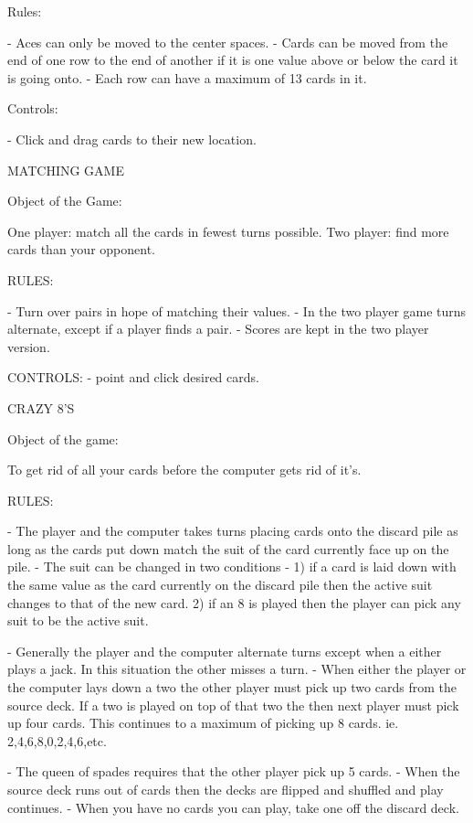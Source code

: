 Rules:

- Aces can only be moved to the center spaces.
- Cards can be moved from the end of one row to the end of another if 
  it is one value above or below the card it is going onto.
- Each row can have a maximum of 13 cards in it.

Controls:

- Click and drag cards to their new location.



MATCHING GAME

Object of the Game:

One player: match all the cards in fewest turns possible.
Two player: find more cards than your opponent.

RULES:

- Turn over pairs in hope of matching their values.
- In the two player game turns alternate, except if a player finds a
pair.
- Scores are kept in the two player version.

CONTROLS:
- point and click desired cards.


CRAZY 8'S

Object of the game:

     To get rid of all your cards before the computer gets rid of    
     it's.

RULES:

- The player and the computer takes turns placing cards onto the
discard pile as long as the cards put down match the suit of the card
currently face up on the pile.
- The suit can be changed in two conditions - 
     1) if a card is laid down with the same value as the card       
	currently on the discard pile then the active suit changes to
	that of the new card.
     2) if an 8 is played then the player can pick any suit to be the
	active suit.

- Generally the player and the computer alternate turns except when a
either plays a jack.  In this situation the other misses a turn.
- When either the player or the computer lays down a two the other
player must pick up two cards from the source deck.  If a two is
played on top of that two the then next player must pick up four
cards.  This continues to a maximum of picking up 8 cards.
     ie. 2,4,6,8,0,2,4,6,etc.
 
- The queen of spades requires that the other player pick up 5
cards.
- When the source deck runs out of cards then the decks are flipped
and shuffled and play continues.
- When you have no cards you can play, take one off the discard deck.

